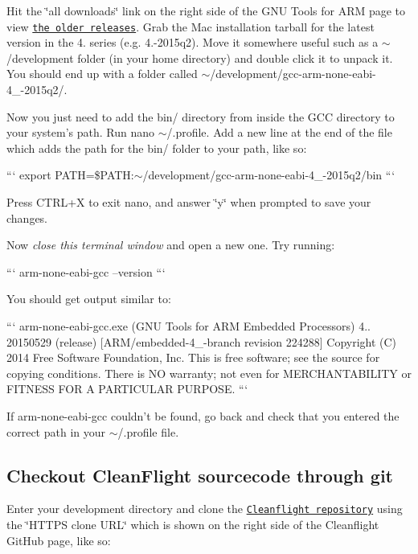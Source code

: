 Hit the \char`\"{}all downloads\char`\"{} link on the right side of the G\+N\+U Tools for A\+R\+M page to view \href{https://launchpad.net/gcc-arm-embedded/+download}{\tt the older releases}. Grab the Mac installation tarball for the latest version in the 4. series (e.\+g. 4.-\/2015q2). Move it somewhere useful such as a {\ttfamily $\sim$/development} folder (in your home directory) and double click it to unpack it. You should end up with a folder called {\ttfamily $\sim$/development/gcc-\/arm-\/none-\/eabi-\/4\+\_-\/2015q2/}.

Now you just need to add the {\ttfamily bin/} directory from inside the G\+C\+C directory to your system's path. Run {\ttfamily nano $\sim$/.profile}. Add a new line at the end of the file which adds the path for the {\ttfamily bin/} folder to your path, like so\+:

``` export P\+A\+T\+H=\$\+P\+A\+T\+H\+:$\sim$/development/gcc-\/arm-\/none-\/eabi-\/4\+\_-\/2015q2/bin ```

Press C\+T\+R\+L+\+X to exit nano, and answer \char`\"{}y\char`\"{} when prompted to save your changes.

Now {\itshape close this terminal window} and open a new one. Try running\+:

``` arm-\/none-\/eabi-\/gcc --version ```

You should get output similar to\+:

``` arm-\/none-\/eabi-\/gcc.\+exe (G\+N\+U Tools for A\+R\+M Embedded Processors) 4.. 20150529 (release) \mbox{[}A\+R\+M/embedded-\/4\+\_-\/branch revision 224288\mbox{]} Copyright (C) 2014 Free Software Foundation, Inc. This is free software; see the source for copying conditions. There is N\+O warranty; not even for M\+E\+R\+C\+H\+A\+N\+T\+A\+B\+I\+L\+I\+T\+Y or F\+I\+T\+N\+E\+S\+S F\+O\+R A P\+A\+R\+T\+I\+C\+U\+L\+A\+R P\+U\+R\+P\+O\+S\+E. ```

If {\ttfamily arm-\/none-\/eabi-\/gcc} couldn't be found, go back and check that you entered the correct path in your {\ttfamily $\sim$/.profile} file.

\subsection*{Checkout Clean\+Flight sourcecode through git}

Enter your development directory and clone the \href{https://github.com/cleanflight/cleanflight}{\tt Cleanflight repository} using the \char`\"{}\+H\+T\+T\+P\+S clone U\+R\+L\char`\"{} which is shown on the right side of the Cleanflight Git\+Hub page, like so\+:

